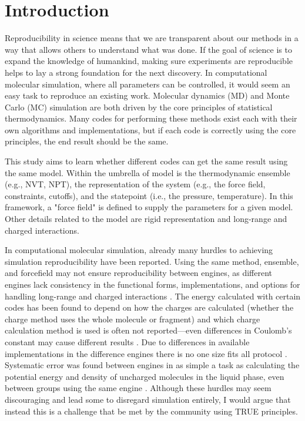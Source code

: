 \section{Introduction}
Reproducibility in science means that we are transparent about our methods in a way that allows others to understand what was done.
If the goal of science is to expand the knowledge of humankind, making sure experiments are reproducible helps to lay a strong foundation for the next discovery.
In computational molecular simulation, where all parameters can be controlled, it would seem an easy task to reproduce an existing work.
Molecular dynamics (MD) and Monte Carlo (MC) simulation are both driven by the core principles of statistical thermodynamics.
Many codes for performing these methods exist each with their own algorithms and implementations, but if each code is correctly using the core principles, the end result should be the same.

This study aims to learn whether different codes can get the same result using the same model.
Within the umbrella of model is the thermodynamic ensemble (e.g., NVT, NPT), the representation of the system (e.g., the force field, constraints, cutoffs), and the statepoint (i.e., the pressure, temperature).
In this framework, a "force field" is defined to supply the parameters for a given model.
Other details related to the model are rigid representation and long-range and charged interactions.

In computational molecular simulation, already many hurdles to achieving simulation reproducibility have been reported. 
Using the same method, ensemble, and forcefield may not ensure reproducibility between engines, as different engines lack consistency in the functional forms, implementations, and options for handling long-range and charged interactions \citep{Rizzi2020}. 
The energy calculated with certain codes has been found to depend on how the charges are calculated (whether the charge method uses the whole molecule or fragment) and which charge calculation method is used is often not reported---even differences in Coulomb's constant may cause different results \citep{Shirts2017}.
Due to differences in available implementations in the difference engines there is no one size fits all protocol \citep{Loeffler2018}.
Systematic error was found between engines in as simple a task as calculating the potential energy and density of uncharged molecules in the liquid phase, even between groups using the same engine \citep{Schappals2017}.
Although these hurdles may seem discouraging and lead some to disregard simulation entirely, I would argue that instead this is a challenge that be met by the community using TRUE principles.

